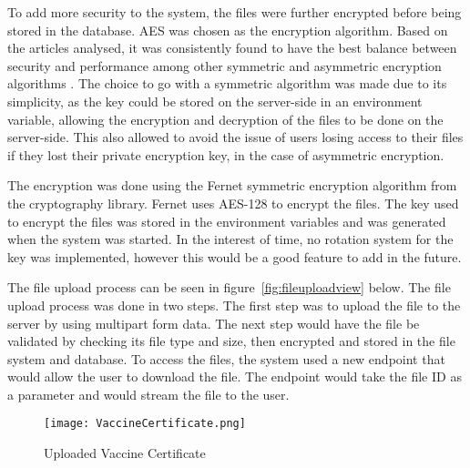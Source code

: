 \noindent\begin{minipage}{\textwidth}
  \begin{center}
      \label{fig:erd_s2}
  \end{center}
\end{minipage}

To add more security to the system, the files were further encrypted before being stored in the database. AES was chosen as the encryption algorithm. Based on the articles analysed, it was consistently found to have the best balance between security and performance among other symmetric and asymmetric encryption algorithms \parencite{crypt1,crypt2,crypt3}. The choice to go with a symmetric algorithm was made due to its simplicity, as the key could be stored on the server-side in an environment variable, allowing the encryption and decryption of the files to be done on the server-side. This also allowed to avoid the issue of users losing access to their files if they lost their private encryption key, in the case of asymmetric encryption.

The encryption was done using the Fernet symmetric encryption algorithm from the cryptography library. Fernet uses AES-128 to encrypt the files. The key used to encrypt the files was stored in the environment variables and was generated when the system was started. In the interest of time, no rotation system for the key was implemented, however this would be a good feature to add in the future. 

The file upload process can be seen in figure~\ref{fig:fileuploadview} below. The file upload process was done in two steps. The first step was to upload the file to the server by using multipart form data. The next step would have the file be validated by checking its file type and size, then encrypted and stored in the file system and database. To access the files, the system used a new endpoint that would allow the user to download the file. The endpoint would take the file ID as a parameter and would stream the file to the user.

\begin{figure}[htbp]
  \centering
  \texttt{[image: VaccineCertificate.png]}
  \caption{Uploaded Vaccine Certificate}\label{fig:vaccinecertificate}
\end{figure}

